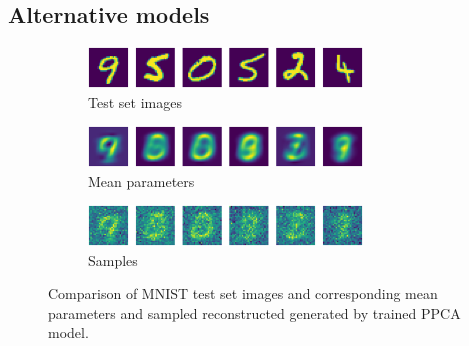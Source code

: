 \subsection{Alternative models}
\begin{figure}[H]
	\begin{subfigure}[t]{1\textwidth}
		\centering
		\includegraphics[width = 0.8\textwidth]{figures/ppca/real}
		\caption{Test set images}
		\label{fig:ppca:real}
	\end{subfigure}
	\begin{subfigure}[t]{1\textwidth}
		\centering
		\includegraphics[width = 0.8\textwidth]{figures/ppca/mean}
		\caption{Mean parameters}
		\label{fig:ppca:mean}
	\end{subfigure}
	\begin{subfigure}[t]{1\textwidth}
		\centering
		\includegraphics[width = 0.8\textwidth]{figures/ppca/sample}
		\caption{Samples}
		\label{fig:ppca:sample}
	\end{subfigure}
	\caption{Comparison of MNIST test set images and corresponding mean parameters and sampled reconstructed generated by trained PPCA model.}
	\label{fig:ppca:_v_real}
\end{figure}


